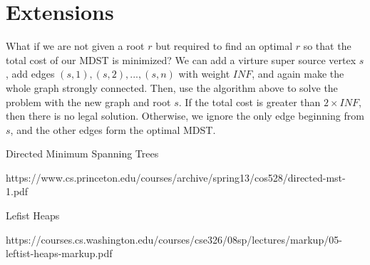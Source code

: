 \documentclass{article}
\begin{document}
\section{Extensions}

What if we are not given a root $r$ but required to find an optimal $r$ so that the total cost of our MDST is minimized? We can add a virture super source vertex $s$, add edges $(s,1),(s,2),...,(s,n)$ with weight $INF$, and again make the whole graph strongly connected. Then, use the algorithm above to solve the problem with the new graph and root $s$. If the total cost is greater than $2\times INF$, then there is no legal solution. Otherwise, we ignore the only edge beginning from $s$, and the other edges form the optimal MDST.

\newpage

\renewcommand\refname{References}
\begin{thebibliography}{99}
     Directed Minimum Spanning Trees

    https://www.cs.princeton.edu/courses/archive/spring13/cos528/directed-mst-1.pdf
    
     Lefist Heaps

    https://courses.cs.washington.edu/courses/cse326/08sp/lectures/markup/05-leftist-heaps-markup.pdf
\end{thebibliography}
\end{document}
